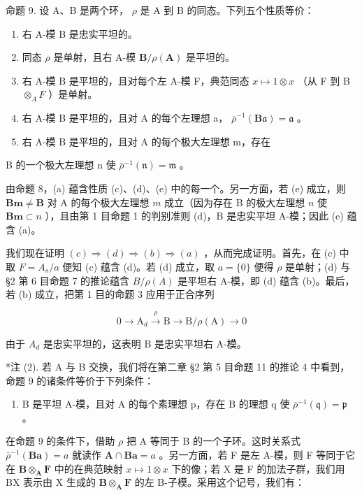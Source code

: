 命题 9. 设 A、B 是两个环， \(\rho\) 是 A 到 B 的同态。下列五个性质等价：

\begin{enumerate}
\def\labelenumi{(\alph{enumi})}
\item
  右 A-模 B 是忠实平坦的。
\item
  同态 \(\rho\) 是单射，且右 A-模 \(\mathbf{B} / \rho (\mathbf{A})\) 是平坦的。
\item
  右 A-模 B 是平坦的，且对每个左 A-模 F，典范同态 \(x \mapsto 1 \otimes x\) （从 F 到 B \(\otimes_{A} F\) ）是单射。
\item
  右 A-模 B 是平坦的，且对 A 的每个左理想 a， \(\overline{\rho}^{-1}(\mathbf{B}\mathfrak{a}) = \mathfrak{a}\) 。
\item
  右 A-模 B 是平坦的，且对 A 的每个极大左理想 m，存在
\end{enumerate}

B 的一个极大左理想 n 使 \(\bar{\rho}^{-1}(\mathfrak{n}) = \mathfrak{m}\) 。

由命题 8，(a) 蕴含性质 (c)、(d)、(e) 中的每一个。另一方面，若 (e) 成立，则 \(\mathbf{Bm} \neq \mathbf{B}\) 对 A 的每个极大左理想 \(m\) 成立（因为存在 B 的极大左理想 \(n\) 使 \(\mathbf{Bm} \subset n\) ），且由第 1 目命题 1 的判别准则 (d)，B 是忠实平坦 A-模；因此 (e) 蕴含 (a)。

我们现在证明 \((c) \Rightarrow (d) \Rightarrow (b) \Rightarrow (a)\) ，从而完成证明。首先，在 (c) 中取 \(F = A_{s}/a\) 便知 (c) 蕴含 (d)。若 (d) 成立，取 \(a = \{0\}\) 便得 \(\rho\) 是单射；(d) 与 §2 第 6 目命题 7 的推论蕴含 \(B/\rho(A)\) 是平坦右 A-模，即 (d) 蕴含 (b)。最后，若 (b) 成立，把第 1 目的命题 3 应用于正合序列

\[
0 \longrightarrow \mathrm{A} _ {d} \stackrel {\rho} {\longrightarrow} \mathrm{B} \longrightarrow \mathrm{B} / \rho (\mathrm{A}) \longrightarrow 0
\]

由于 \(A_{d}\) 是忠实平坦的，这表明 B 是忠实平坦右 A-模。

*注 (2). 若 A 与 B 交换，我们将在第二章 §2 第 5 目命题 11 的推论 4 中看到，命题 9 的诸条件等价于下列条件：

\begin{enumerate}
\def\labelenumi{(\alph{enumi})}
\setcounter{enumi}{5}
\tightlist
\item
  B 是平坦 A-模，且对 A 的每个素理想 p，存在 B 的理想 q 使 \(\overline{\rho}^{-1}(\mathfrak{q}) = \mathfrak{p}\) 。
\end{enumerate}

在命题 9 的条件下，借助 \(\rho\) 把 A 等同于 B 的一个子环。这时关系式 \(\bar{\rho}^{-1}(\mathbf{Ba}) = a\) 就读作 \(\mathbf{A} \cap \mathbf{Ba} = a\) 。另一方面，若 F 是左 A-模，则 F 等同于它在 \(\mathbf{B} \otimes_{\mathbf{A}} \mathbf{F}\) 中的在典范映射 \(x \mapsto 1 \otimes x\) 下的像；若 X 是 F 的加法子群，我们用 BX 表示由 X 生成的 \(\mathbf{B} \otimes_{\mathbf{A}} \mathbf{F}\) 的左 B-子模。采用这个记号，我们有：

